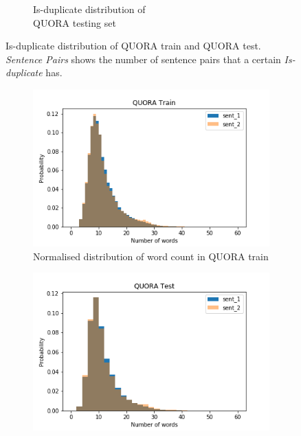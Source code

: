 \begin{enumerate}
\begin{figure}
\begin{subfigure}[b]{.5\textwidth}
		\caption{Is-duplicate distribution of \\ QUORA testing set}
		\label{fig:quora_test_is_duplicate}
	\end{subfigure}
	\caption[Is-duplicate distribution of QUORA train and QUORA test]{Is-duplicate distribution of QUORA train and QUORA test. \textit{Sentence Pairs} shows the number of sentence pairs that a certain \textit{Is-duplicate} has.}
	\label{fig:quora_is_duplicate}
\end{figure}


\begin{figure}
	\captionsetup[subfigure]{justification=centering}
	\centering
	\begin{subfigure}[b]{.5\textwidth}
		\centering
		\includegraphics[width=\textwidth]{figures/semantic_textual_similarity/introduction/quora_train_words.png}
		\caption{Normalised distribution of word count in QUORA train}
		\label{fig:quora_train_words}
	\end{subfigure}%
	\begin{subfigure}[b]{.5\textwidth}
		\centering
		\includegraphics[width=\textwidth]{figures/semantic_textual_similarity/introduction/quora_test_words.png}

\end{subfigure}
\end{figure}
\end{enumerate}
